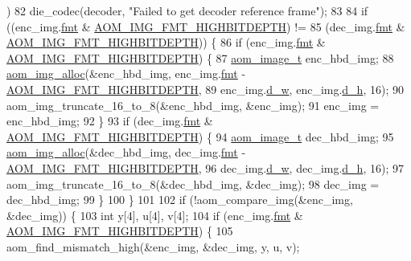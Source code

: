 \begin{DoxyCodeInclude}
{      )
82     die\_codec(decoder, \textcolor{stringliteral}{"Failed to get decoder reference frame"});
83 
84   \textcolor{keywordflow}{if} ((enc\_img.\hyperlink{structaom__image_a6c64b1ab918d80d52eb8f5d6d957e825}{fmt} & \hyperlink{aom__image_8h_a607b37d91f75442f54223ecd85f1b6cb}{AOM\_IMG\_FMT\_HIGHBITDEPTH}) !=
85       (dec\_img.\hyperlink{structaom__image_a6c64b1ab918d80d52eb8f5d6d957e825}{fmt} & \hyperlink{aom__image_8h_a607b37d91f75442f54223ecd85f1b6cb}{AOM\_IMG\_FMT\_HIGHBITDEPTH})) \{
86     \textcolor{keywordflow}{if} (enc\_img.\hyperlink{structaom__image_a6c64b1ab918d80d52eb8f5d6d957e825}{fmt} & \hyperlink{aom__image_8h_a607b37d91f75442f54223ecd85f1b6cb}{AOM\_IMG\_FMT\_HIGHBITDEPTH}) \{
87       \hyperlink{structaom__image}{aom\_image\_t} enc\_hbd\_img;
88       \hyperlink{aom__image_8h_a570db29fbd122951235a08fe9375f6bb}{aom\_img\_alloc}(&enc\_hbd\_img, enc\_img.\hyperlink{structaom__image_a6c64b1ab918d80d52eb8f5d6d957e825}{fmt} - 
      \hyperlink{aom__image_8h_a607b37d91f75442f54223ecd85f1b6cb}{AOM\_IMG\_FMT\_HIGHBITDEPTH},
89                     enc\_img.\hyperlink{structaom__image_a89f80b1f58d608b9d2080635f4359034}{d\_w}, enc\_img.\hyperlink{structaom__image_ab986419a1f0fff93a2dc505f47194988}{d\_h}, 16);
90       aom\_img\_truncate\_16\_to\_8(&enc\_hbd\_img, &enc\_img);
91       enc\_img = enc\_hbd\_img;
92     \}
93     \textcolor{keywordflow}{if} (dec\_img.\hyperlink{structaom__image_a6c64b1ab918d80d52eb8f5d6d957e825}{fmt} & \hyperlink{aom__image_8h_a607b37d91f75442f54223ecd85f1b6cb}{AOM\_IMG\_FMT\_HIGHBITDEPTH}) \{
94       \hyperlink{structaom__image}{aom\_image\_t} dec\_hbd\_img;
95       \hyperlink{aom__image_8h_a570db29fbd122951235a08fe9375f6bb}{aom\_img\_alloc}(&dec\_hbd\_img, dec\_img.\hyperlink{structaom__image_a6c64b1ab918d80d52eb8f5d6d957e825}{fmt} - 
      \hyperlink{aom__image_8h_a607b37d91f75442f54223ecd85f1b6cb}{AOM\_IMG\_FMT\_HIGHBITDEPTH},
96                     dec\_img.\hyperlink{structaom__image_a89f80b1f58d608b9d2080635f4359034}{d\_w}, dec\_img.\hyperlink{structaom__image_ab986419a1f0fff93a2dc505f47194988}{d\_h}, 16);
97       aom\_img\_truncate\_16\_to\_8(&dec\_hbd\_img, &dec\_img);
98       dec\_img = dec\_hbd\_img;
99     \}
100   \}
101 
102   \textcolor{keywordflow}{if} (!aom\_compare\_img(&enc\_img, &dec\_img)) \{
103     \textcolor{keywordtype}{int} y[4], u[4], v[4];
104     \textcolor{keywordflow}{if} (enc\_img.\hyperlink{structaom__image_a6c64b1ab918d80d52eb8f5d6d957e825}{fmt} & \hyperlink{aom__image_8h_a607b37d91f75442f54223ecd85f1b6cb}{AOM\_IMG\_FMT\_HIGHBITDEPTH}) \{
105       aom\_find\_mismatch\_high(&enc\_img, &dec\_img, y, u, v);
}
\end{DoxyCodeInclude}

